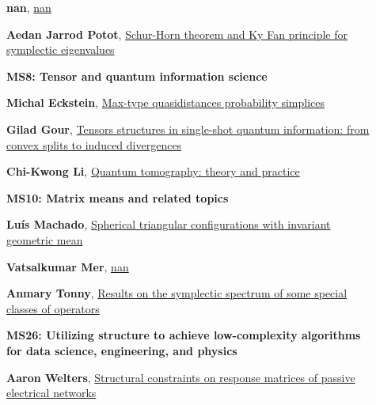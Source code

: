 \documentclass[ILAS2025-program.tex]{subfiles}
\begin{document}
\begin{description}
\begin{description}
        \item[] \hypertarget{up0047}{}\textbf{nan}, \hyperlink{down0047}{nan}
        \item[] \hypertarget{up0048}{}\textbf{Aedan Jarrod Potot}, \hyperlink{down0048}{Schur-Horn theorem and Ky Fan principle for symplectic eigenvalues
}
        \end{description}
    \begin{description}
    \item[] {\color{mstitle}\textbf{MS8: Tensor and quantum information science}} 
    \item[] \hypertarget{up0052}{}\textbf{Michal Eckstein}, \hyperlink{down0052}{Max-type quasidistances probability simplices}
        \item[] \hypertarget{up0053}{}\textbf{Gilad Gour}, \hyperlink{down0053}{Tensors structures in single-shot quantum information: from convex splits to induced divergences}
        \item[] \hypertarget{up0054}{}\textbf{Chi-Kwong Li}, \hyperlink{down0054}{Quantum tomography: theory and practice
}
        \end{description}
    \begin{description}
    \item[] {\color{mstitle}\textbf{MS10: Matrix means and related topics}} 
    \item[] \hypertarget{up0055}{}\textbf{Luís Machado}, \hyperlink{down0055}{Spherical triangular configurations with invariant geometric mean}
        \item[] \hypertarget{up0056}{}\textbf{Vatsalkumar Mer}, \hyperlink{down0056}{nan}
        \item[] \hypertarget{up0057}{}\textbf{Anmary Tonny}, \hyperlink{down0057}{Results on the symplectic spectrum of some special classes of operators}
        \end{description}
    \begin{description}
    \item[] {\color{mstitle}\textbf{MS26: Utilizing structure to achieve low-complexity algorithms for data science, engineering, and physics}} 
    \item[] \hypertarget{up0058}{}\textbf{Aaron Welters}, \hyperlink{down0058}{Structural constraints on response matrices of passive electrical networks
}
\end{description}
\end{description}
\end{document}
